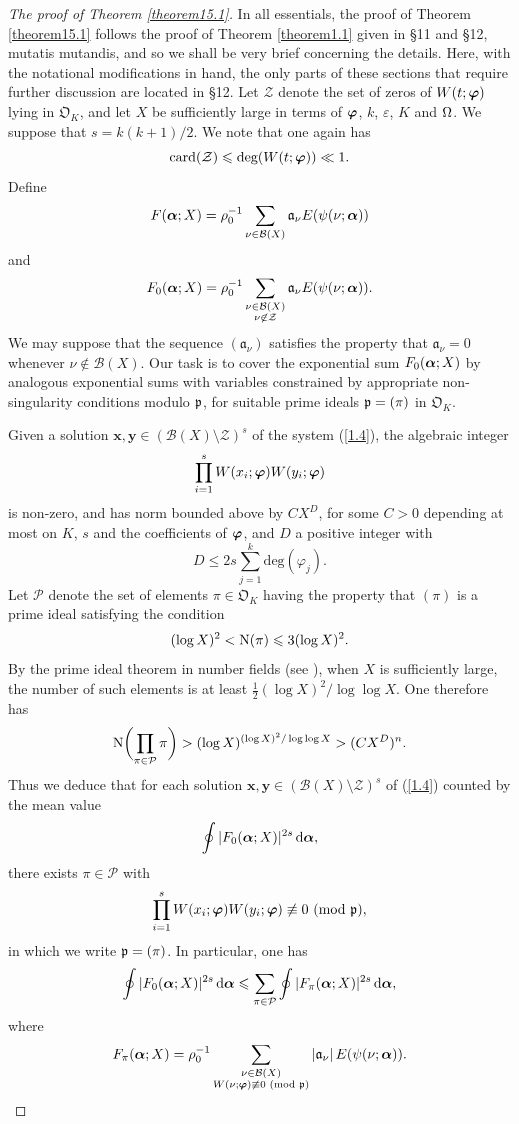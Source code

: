 \documentclass[12pt,reqno]{amsart}
\theoremstyle{definition}
\theoremstyle{remark}
\numberwithin{equation}{section}
\newcommand{\mmod}[1]{\,\,(\text{\rm mod}\,\,#1)}
\def\bfx{{\mathbf x}}
\def\bfy{{\mathbf y}}
\def\calB{{\mathcal B}} \def\calBtil{{\widetilde \calB}}
\def\calP{{\mathcal P}}
\def\calZ{{\mathcal Z}}
\def\gra{{\mathfrak a}}\def\grA{{\mathfrak A}}\def\bfgra{{\boldsymbol \gra}}
\def\grO{{\mathfrak O}}
\def\eps{\varepsilon}
\def\le{\leqslant} \def\ge{\geqslant} \def\pleq{\preccurlyeq} \def\ple{\prec}
\def\d{{\,{\rm d}}}
\begin{document}
\begin{proof}[The proof of Theorem \ref{theorem15.1}] In all essentials, the proof of 
Theorem \ref{theorem15.1} follows the proof of Theorem \ref{theorem1.1} given in \S11 
and \S12, mutatis mutandis, and so we shall be very brief concerning the details. Here, with 
the notational modifications in hand, the only parts of these sections that require further 
discussion are located in \S12. Let $\calZ$ denote the set of zeros of $W(t;{\boldsymbol \varphi})$ lying 
in $\grO_K$, and let $X$ be sufficiently large in terms of ${\boldsymbol \varphi}$, $k$, $\eps$, $K$ and 
${\Omega}$. We suppose that $s=k(k+1)/2$. We note that one again has
$$\text{card}(\calZ)\le \text{deg}(W(t;\bfvarphi))\ll 1.$$
Define
$$F(\bfalp;X)=\rho_0^{-1}\sum_{\nu \in \calB(X)}\gra_\nu E(\psi(\nu;\bfalp))$$
and
$$F_0(\bfalp;X)=\rho_0^{-1}\sum_{\substack{\nu \in \calB(X)\\ \nu \not\in \calZ}}\gra_\nu 
E(\psi(\nu;\bfalp)).$$
We may suppose that the sequence $(\gra_\nu)$ satisfies the property that $\gra_\nu=0$ 
whenever $\nu\not\in \calB(X)$. Our task is to cover the exponential sum $F_0({\boldsymbol \alpha};X)$ 
by analogous exponential sums with variables constrained by appropriate non-singularity 
conditions modulo ${\mathfrak p}$, for suitable prime ideals ${\mathfrak p}=(\pi)$ in $\grO_K$.\par

Given a solution $\bfx,\bfy\in (\calB(X)\setminus \calZ)^s$ of the system (\ref{1.4}), the 
algebraic integer
$$\prod_{i=1}^sW(x_i;{\boldsymbol \varphi})W(y_i;{\boldsymbol \varphi})$$
is non-zero, and has norm bounded above by $CX^D$, for some $C>0$ depending at most 
on $K$, $s$ and the coefficients of ${\boldsymbol \varphi}$, and $D$ a positive integer with
$$D\le 2s\sum_{j=1}^k\text{deg}(\varphi_j).$$
Let $\calP$ denote the set of elements $\pi\in \grO_K$ having the property that $(\pi)$ is a 
prime ideal satisfying the condition
$$(\log X)^2<{\rm N}(\pi)\le 3(\log X)^2.$$
By the prime ideal theorem in number fields (see \cite{Lan1903}), when $X$ is sufficiently 
large, the number of such elements is at least $\tfrac{1}{2}(\log X)^2/\log \log X$. One 
therefore has
$${\rm N}\biggl( \prod_{\pi\in \calP}\pi\biggr) >(\log X)^{(\log X)^2/\log\log X}>
(CX^D)^n.$$
Thus we deduce that for each solution $\bfx,\bfy\in (\calB(X)\setminus \calZ)^s$ of 
(\ref{1.4}) counted by the mean value
$$\oint |F_0(\bfalp;X)|^{2s}\d\bfalp,$$
there exists $\pi\in \calP$ with
$$\prod_{i=1}^sW(x_i;\bfvarphi)W(y_i;\bfvarphi)\not\equiv 0\mmod{\grp},$$
in which we write ${\mathfrak p}=(\pi)$. In particular, one has
\begin{equation}\label{15.3}
\oint |F_0(\bfalp;X)|^{2s}\d\bfalp \le \sum_{\pi \in \calP}\oint |F_\pi(\bfalp;X)|^{2s}
\d\bfalp ,
\end{equation}
where
$$F_\pi (\bfalp;X)=\rho_0^{-1}
\sum_{\substack{\nu\in \calB(X)\\ W(\nu;\bfvarphi)\not\equiv 0\mmod{\grp}}}|
\gra_\nu|\,E(\psi(\nu;\bfalp)).$$


\end{proof}
\end{document}
